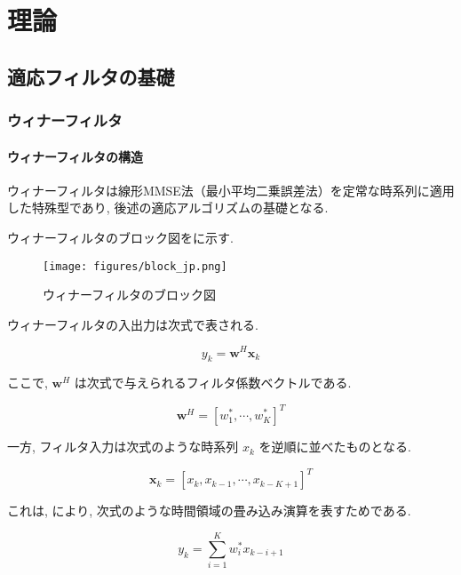 \chapter{理論}\label{theory}

\section{適応フィルタの基礎}\label{basis-adf}

\subsection{ウィナーフィルタ}\label{wiener}

\subsubsection{ウィナーフィルタの構造}\label{wiener-structure}

ウィナーフィルタは線形MMSE法（最小平均二乗誤差法）を定常な時系列に適用した特殊型であり, 後述の適応アルゴリズムの基礎となる. 

ウィナーフィルタのブロック図をに示す. 

\begin{figure}[H]
\centering
\texttt{[image: figures/block\_jp.png]}
\caption{ウィナーフィルタのブロック図}
\label{block_jp}
\end{figure}


ウィナーフィルタの入出力は次式で表される. 

\begin{equation}
y_k = \bm{w}^H \bm{x}_k
\label{simple_y}
\end{equation}

ここで, \( \bm{w}^H\) は次式で与えられるフィルタ係数ベクトルである. 

\begin{equation}
\bm{w}^H = [w_1^*, \cdots, w_{K}^*]^T
\end{equation}

一方, フィルタ入力は次式のような時系列 \({x_k}\)
を逆順に並べたものとなる. 

\begin{equation}
\bm{x}_k = [x_k, x_{k-1}, \cdots, x_{k-K+1}]^T
\end{equation}

これは, により, 次式のような時間領域の畳み込み演算を表すためである. 

\begin{equation}
y_k = \sum_{i=1}^K w_i^* x_{k-i+1}
\end{equation}

